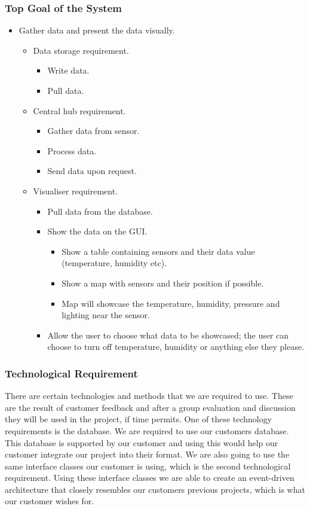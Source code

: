 \documentclass[../document]{subfiles}
\begin{document}
\subsubsection{Top Goal of the System}
\begin{itemize}
\item
Gather data and present the data visually.
\begin{itemize}
\item
Data storage requirement.
\begin{itemize}
\item
Write data.
\item
Pull data.
\end{itemize}
\item
Central hub requirement.
\begin{itemize}
\item
Gather data from sensor.
\item
Process data.
\item
Send data upon request.
\end{itemize}
\item
Visualiser requirement.
\begin{itemize}
\item
Pull data from the database.
\item
Show the data on the GUI.
\begin{itemize}
\item
Show a table containing sensors and their data value (temperature, humidity etc).
\item
Show a map with sensors and their position if possible.
\item
Map will showcase the temperature, humidity, pressure and lighting near the sensor.
\end{itemize}
\item
Allow the user to choose what data to be showcased; the user can choose to turn off temperature, humidity or anything else they please.
\end{itemize}
\end{itemize}
\end{itemize}

\subsubsection{Technological Requirement}
There are certain technologies and methods that we are required to use. These are the result of customer feedback and after a group evaluation and discussion they will be used in the project, if time permits. One of these technology requirements is the database. We are required to use our customers database. This database is supported by our customer and using this would help our customer integrate our project into their format. We are also going to use the same interface classes our customer is using, which is the second technological requirement. Using these interface classes we are able to create an event-driven architecture that closely resembles our customers previous projects, which is what our customer wishes for.
\end{document}
